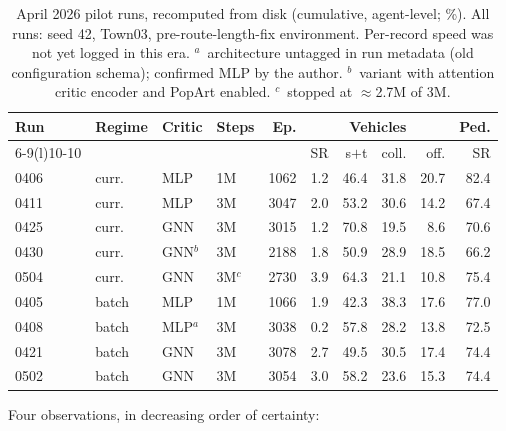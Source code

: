 \begin{table}[t]
  \centering\small
  \caption{April 2026 pilot runs, recomputed from disk (cumulative,
  agent-level; \%). All runs: seed 42, Town03, pre-route-length-fix
  environment. Per-record speed was not yet logged in this era.
  $^{a}$~architecture untagged in run metadata (old configuration
  schema); confirmed MLP by the author. $^{b}$~variant with attention critic encoder
  and PopArt enabled. $^{c}$~stopped at $\approx$2.7M of 3M.}
  \label{tab:pilot}
  \begin{tabular}{@{}llllrrrrrr@{}}
    \toprule
    Run & Regime & Critic & Steps & Ep. & \multicolumn{4}{c}{Vehicles} & Ped. \\
    \cmidrule(lr){6-9}\cmidrule(l){10-10}
    & & & & & SR & s$+$t & coll. & off. & SR \\
    \midrule
    0406 & curr.\ & MLP & 1M & 1062 & 1.2 & 46.4 & 31.8 & 20.7 & 82.4 \\
    0411 & curr.\ & MLP & 3M & 3047 & 2.0 & 53.2 & 30.6 & 14.2 & 67.4 \\
    0425 & curr.\ & GNN & 3M & 3015 & 1.2 & 70.8 & 19.5 & 8.6 & 70.6 \\
    0430 & curr.\ & GNN$^{b}$ & 3M & 2188 & 1.8 & 50.9 & 28.9 & 18.5 & 66.2 \\
    0504 & curr.\ & GNN & 3M$^{c}$ & 2730 & 3.9 & 64.3 & 21.1 & 10.8 & 75.4 \\
    0405 & batch & MLP & 1M & 1066 & 1.9 & 42.3 & 38.3 & 17.6 & 77.0 \\
    0408 & batch & MLP$^{a}$ & 3M & 3038 & 0.2 & 57.8 & 28.2 & 13.8 & 72.5 \\
    0421 & batch & GNN & 3M & 3078 & 2.7 & 49.5 & 30.5 & 17.4 & 74.4 \\
    0502 & batch & GNN & 3M & 3054 & 3.0 & 58.2 & 23.6 & 15.3 & 74.4 \\
    \bottomrule
  \end{tabular}
\end{table}

Four observations, in decreasing order of certainty:

